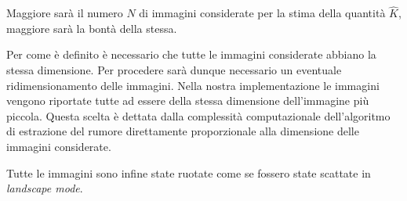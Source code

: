 Maggiore sarà il numero $N$ di immagini considerate per la stima della quantità $\hat{K}$, maggiore sarà la bontà della stessa.

Per come è definito è necessario che tutte le immagini considerate abbiano la stessa dimensione. Per procedere sarà dunque necessario un eventuale ridimensionamento delle immagini. Nella nostra implementazione le immagini vengono riportate tutte ad essere della stessa dimensione dell'immagine più piccola. Questa scelta è dettata dalla complessità computazionale dell'algoritmo di estrazione del rumore direttamente proporzionale alla dimensione delle immagini considerate.

Tutte le immagini sono infine state ruotate come se fossero state scattate in \emph{landscape mode}.